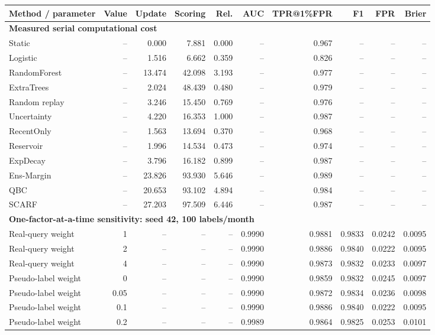 \setlength{\tabcolsep}{2.5pt}
\begin{tabular}{lrrrrrrrrr}
\toprule
Method / parameter & Value & Update & Scoring & Rel. & AUC & TPR@1\%FPR & F1 & FPR & Brier \\
\midrule
\multicolumn{10}{l}{\textbf{Measured serial computational cost}} \\
Static & -- & 0.000 & 7.881 & 0.000 & -- & 0.967 & -- & -- & -- \\
Logistic & -- & 1.516 & 6.662 & 0.359 & -- & 0.826 & -- & -- & -- \\
RandomForest & -- & 13.474 & 42.098 & 3.193 & -- & 0.977 & -- & -- & -- \\
ExtraTrees & -- & 2.024 & 48.439 & 0.480 & -- & 0.979 & -- & -- & -- \\
Random replay & -- & 3.246 & 15.450 & 0.769 & -- & 0.976 & -- & -- & -- \\
Uncertainty & -- & 4.220 & 16.353 & 1.000 & -- & 0.987 & -- & -- & -- \\
RecentOnly & -- & 1.563 & 13.694 & 0.370 & -- & 0.968 & -- & -- & -- \\
Reservoir & -- & 1.996 & 14.534 & 0.473 & -- & 0.974 & -- & -- & -- \\
ExpDecay & -- & 3.796 & 16.182 & 0.899 & -- & 0.987 & -- & -- & -- \\
Ens-Margin & -- & 23.826 & 93.930 & 5.646 & -- & 0.989 & -- & -- & -- \\
QBC & -- & 20.653 & 93.102 & 4.894 & -- & 0.984 & -- & -- & -- \\
SCARF & -- & 27.203 & 97.509 & 6.446 & -- & 0.987 & -- & -- & -- \\
\midrule
\multicolumn{10}{l}{\textbf{One-factor-at-a-time sensitivity: seed 42, 100 labels/month}} \\
Real-query weight & 1 & -- & -- & -- & 0.9990 & 0.9881 & 0.9833 & 0.0242 & 0.0095 \\
Real-query weight & 2 & -- & -- & -- & 0.9990 & 0.9886 & 0.9840 & 0.0222 & 0.0095 \\
Real-query weight & 4 & -- & -- & -- & 0.9990 & 0.9873 & 0.9832 & 0.0233 & 0.0097 \\
Pseudo-label weight & 0 & -- & -- & -- & 0.9990 & 0.9859 & 0.9832 & 0.0245 & 0.0097 \\
Pseudo-label weight & 0.05 & -- & -- & -- & 0.9990 & 0.9872 & 0.9834 & 0.0236 & 0.0098 \\
Pseudo-label weight & 0.1 & -- & -- & -- & 0.9990 & 0.9886 & 0.9840 & 0.0222 & 0.0095 \\
Pseudo-label weight & 0.2 & -- & -- & -- & 0.9989 & 0.9864 & 0.9825 & 0.0253 & 0.0101 \\

\end{tabular}
